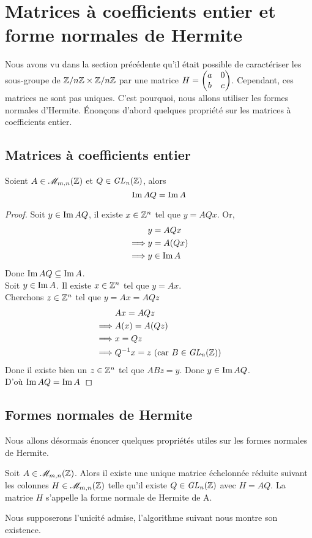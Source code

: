 \documentclass[11pt]{article}
\begin{document}
\section{Matrices à coefficients entier et forme normales de Hermite}
Nous avons vu dans la section précédente qu'il était possible de caractériser les sous-groupe de
$\mathbb Z/n\mathbb Z \times \mathbb Z/n\mathbb Z$ par une matrice $H = \begin{pmatrix} a & 0\\ b & c \end{pmatrix}$. Cependant, ces matrices ne sont pas uniques. C'est
pourquoi, nous allons utiliser les formes normales d'Hermite.
Énonçons d'abord quelques propriété sur les matrices à coefficients entier.
\subsection{Matrices à coefficients entier}
\begin{proposition}
	Soient $A \in \mathscr{M}_{m,n}(\mathbb Z)$ et $Q \in \it {GL}_n(\mathbb Z)$, alors
	$$\operatorname{Im} AQ = \operatorname{Im} A$$
\end{proposition}
\begin{proof}
	Soit $y \in \operatorname{Im} AQ$, il existe $x \in \mathbb Z^n$ tel que $y = AQx$. Or,
	\begin{align*}
		&y = AQx\\
		\implies &y = A(Qx)\\
		\implies &y \in \operatorname{Im} A
	\end{align*}
	Donc $\operatorname{Im} AQ \subseteq \operatorname{Im} A$.\\
	Soit $y \in \operatorname{Im} A$. Il existe $x \in \mathbb Z^n$ tel que $y = Ax$.\\
	Cherchons $z \in \mathbb Z^n$ tel que $y = Ax = AQz$
	\begin{align*}
		&Ax = AQz\\
		\implies &A(x) = A(Qz)\\
		\implies &x = Qz\\
		\implies &Q^{-1} x = z \text{ (car $B \in \it {GL}_n(\mathbb Z)$)}
	\end{align*}
	Donc il existe bien un $z \in \mathbb Z^n$ tel que $ABz = y$. Donc $y \in \operatorname{Im} AQ$.\\
	D'où $\operatorname{Im} AQ = \operatorname{Im} A$

\end{proof}
\subsection{Formes normales de Hermite}
Nous allons désormais énoncer quelques propriétés utiles sur les formes normales de Hermite.
\begin{definition}
	Soit $A \in \mathscr{M}_{m,n}(\mathbb Z)$. Alors il existe une unique matrice échelonnée
	réduite suivant les colonnes $H \in \mathscr{M}_{m,n}(\mathbb Z)$ telle qu'il existe $Q \in \it {GL}_n(\mathbb Z)$
	avec $H = AQ$. La matrice $H$ s'appelle la forme normale de Hermite de A.
\end{definition}
Nous supposerons l'unicité admise, l'algorithme suivant nous montre son existence.
\end{document}
